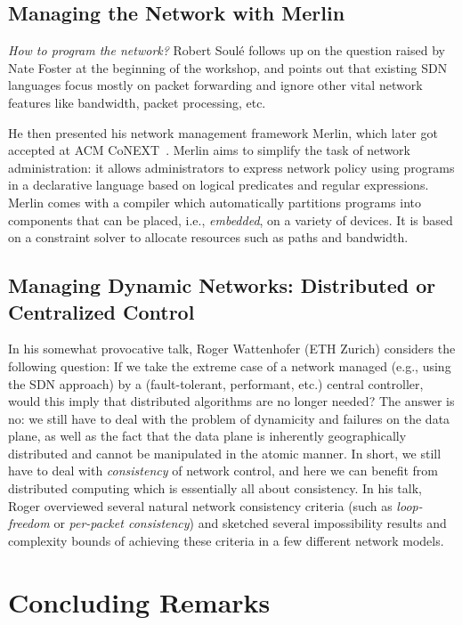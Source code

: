 \documentclass[11pt,pdftex,letter]{article}
\begin{document}
\subsection{Managing the Network with Merlin}

\emph{How to program the network?} Robert Soul\'{e} follows up on the question raised by Nate Foster
at the beginning of the workshop, and points out that
existing SDN languages focus mostly
on packet forwarding and
ignore other vital network features like
bandwidth, packet processing, etc.

He then presented his network management framework Merlin, which later got
accepted at ACM CoNEXT~\cite{merlin}. Merlin aims to
simplify the task of network administration: it
allows administrators to express network policy using programs in a declarative language based on logical predicates and regular expressions.
Merlin comes with a compiler which automatically partitions programs into components that can be placed, i.e., \emph{embedded}, on a variety of devices.
It is based on a constraint solver to allocate resources such as paths and bandwidth. 

\subsection{Managing Dynamic Networks: Distributed or Centralized
  Control}

In his somewhat provocative talk, Roger Wattenhofer (ETH Zurich) considers
the following question: If we take the extreme case of a network
managed (e.g., using the SDN approach) by a (fault-tolerant,
performant, etc.) central controller, would this imply
that distributed algorithms are no longer needed? The answer is no: we still have to deal with the problem of
dynamicity and failures on the data plane, as well as the fact that
the data plane is inherently geographically distributed and cannot be
manipulated in the atomic manner. In short, we still have to deal with
\emph{consistency} of network control, and here we can benefit from
distributed computing which is essentially all about consistency.
In his talk, Roger overviewed several natural network consistency
criteria (such as \emph{loop-freedom} or \emph{per-packet
  consistency}) and sketched several impossibility results and
complexity bounds of achieving these criteria in a few different
network models.


\section{Concluding Remarks}
\end{document}
